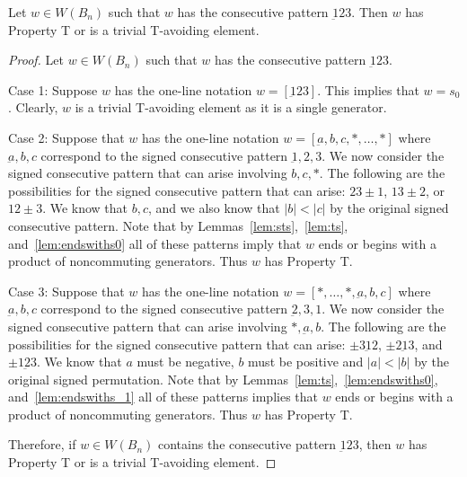 \begin{lemma}\label{lem:123}
Let $w \in W(B_n)$ such that $w$ has the consecutive pattern $\underbar{1}23$. Then $w$ has Property T or is a trivial T-avoiding element.
\begin{proof}
	Let $w \in W(B_n)$ such that $w$ has the consecutive pattern $\underbar{1}23$.
	
	Case 1: Suppose $w$ has the one-line notation $w=[\underbar{1}23]$. This implies that $w=s_0$. Clearly, $w$ is a trivial T-avoiding element as it is a single generator.
	
	Case 2: Suppose that $w$ has the one-line notation $w=[\underbar{a},b,c, \ast, \ldots, \ast]$ where $\underbar{a},b,c$ correspond to the signed consecutive pattern $\underbar{1},2,3$. We now consider the signed consecutive pattern that can arise involving $b,c, \ast$. The following are the possibilities for the signed consecutive pattern that can arise: $23\pm1$, $13 \pm2$, or $12\pm3$. We know that $b,c$, and we also know that $|b|<|c|$ by the original signed consecutive pattern. Note that by Lemmas~\ref{lem:sts},~\ref{lem:ts}, and~\ref{lem:endswiths0} all of these patterns imply that $w$ ends or begins with a product of noncommuting generators. Thus $w$ has Property T.
	
	Case 3: Suppose that $w$ has the one-line notation $w=[\ast, \ldots, \ast, \underbar{a},b,c]$ where $\underbar{a},b,c$ correspond to the signed consecutive pattern $\underbar{2},3,1$. We now consider the signed consecutive pattern that can arise involving $\ast, \underbar{a}, b$. The following are the possibilities for the signed consecutive pattern that can arise: $\pm3 \underbar{1} 2$, $\pm 2 \underbar{1} 3$, and $\pm 1 \underbar{2} 3$. We know that $a$ must be negative, $b$ must be positive and $|a|<|b|$ by the original signed permutation. Note that by Lemmas~\ref{lem:ts},~\ref{lem:endswiths0}, and~\ref{lem:endswiths_1} all of these patterns implies that $w$ ends or begins with a product of noncommuting generators. Thus $w$ has Property T. 

	Therefore, if $w \in W(B_n)$ contains the consecutive pattern $\underbar{1}23$, then $w$ has Property T or is a trivial T-avoiding element.
\end{proof}	
\end{lemma}

